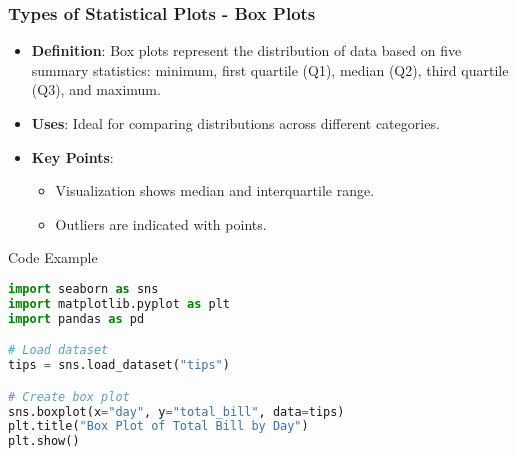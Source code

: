 \documentclass[aspectratio=169]{beamer}
\begin{document}
\begin{frame}[fragile]
    \frametitle{Types of Statistical Plots - Box Plots}
    \begin{itemize}
        \item \textbf{Definition}:
            Box plots represent the distribution of data based on five summary statistics: minimum, first quartile (Q1), median (Q2), third quartile (Q3), and maximum.
        \item \textbf{Uses}:
            Ideal for comparing distributions across different categories.
        \item \textbf{Key Points}:
            \begin{itemize}
                \item Visualization shows median and interquartile range.
                \item Outliers are indicated with points.
            \end{itemize}
    \end{itemize}
    
    \begin{block}{Code Example}
    \begin{lstlisting}[language=Python]
import seaborn as sns
import matplotlib.pyplot as plt
import pandas as pd

# Load dataset
tips = sns.load_dataset("tips")

# Create box plot
sns.boxplot(x="day", y="total_bill", data=tips)
plt.title("Box Plot of Total Bill by Day")
plt.show()
    \end{lstlisting}
    \end{block}
\end{frame}
\end{document}
